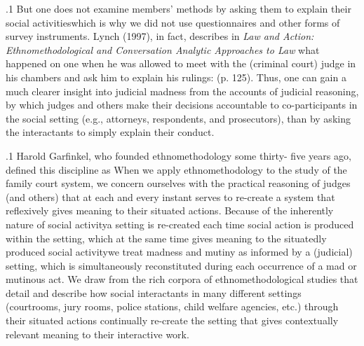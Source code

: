 \documentclass[11pt, twoside]{article}
\begin{document}
{\p.1{%
But one does not examine members’ methods by asking them to explain their social activities\mdash{}which is why we did not use questionnaires
and other forms of survey instruments. Lynch (1997), in fact, describes
in \textit{Law and Action: Ethnomethodological and
Conversation Analytic Approaches to Law} what
happened on one  when he was
allowed to meet with the (criminal court) judge in his chambers and ask
him to explain his rulings:  (p. 125). Thus, one
can gain a much clearer insight into judicial madness from the 
accounts of judicial reasoning, by which judges and others make their
decisions accountable to co-participants in the social setting (e.g., attorneys, respondents, and prosecutors), than by asking the interactants to
simply explain their conduct.
}%

\p.1{%
Harold Garfinkel, who founded ethnomethodology some thirty-
five years ago, defined this discipline as 
When we apply ethnomethodology to the study of the family court
system, we concern ourselves with the practical reasoning of judges (and
others) that at each and every instant serves to re-create a system that
reflexively gives meaning to their situated actions. Because of the inherently  nature of social activity\mdash{}a setting is re-created each
time social action is produced within the setting, which at the same
time gives meaning to the situatedly produced social activity\mdash{}we treat
madness and mutiny as informed by a (judicial) setting, which is simultaneously reconstituted during each occurrence of a mad or mutinous
act. We draw from the rich corpora of ethnomethodological studies that
detail and describe how social interactants in many different settings
(courtrooms, jury rooms, police stations, child welfare agencies, etc.)
through their situated actions continually re-create the setting that gives
contextually relevant meaning to their interactive work.
}%

}
\end{document}
